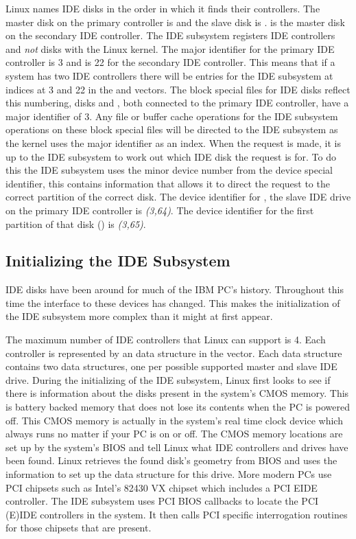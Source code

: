 Linux names IDE disks in the order in which it finds their controllers.
The master disk on the primary controller is  and the slave disk is .
 is the master disk on the secondary IDE controller.
The IDE subsystem registers IDE controllers and {\em not} disks with the Linux kernel.
The major identifier for the primary IDE controller is 3 and is 22 for the secondary IDE controller.
This means that if a system has two IDE controllers there will be entries for the IDE subsystem
at indices at 3 and 22 in the  and 
 vectors.
The block special files for IDE disks reflect this numbering, disks  and ,
both connected to the primary IDE controller, have a major identifier of 3.
Any file or buffer cache operations for the IDE subsystem operations on these block special files
will be directed to the IDE subsystem as the kernel uses the major identifier as an index.
When the request is made, it is up to the IDE subsystem to work out which IDE disk the request is for.
To do this  the IDE subsystem uses the minor device number from the device special identifier, this
contains information that allows it to direct the request to the correct partition of the correct
disk.
The device identifier for , the slave IDE drive on the primary IDE controller is {\em (3,64)}.
The device identifier for the first partition of that disk () is {\em (3,65)}.

\subsection{Initializing the IDE Subsystem}
IDE disks have been around for much of the IBM PC's history.
Throughout this time the interface to these devices has changed.
This makes the initialization of the IDE subsystem more complex than it might at first appear.

The maximum number of IDE controllers that Linux can support is 4.
Each controller is represented by an  data structure in the 
 vector.
Each  data structure contains two  data structures, one per possible
supported master and slave IDE drive.
During the initializing of the IDE subsystem, Linux first looks to see if there is information about the 
disks present in the system's CMOS memory.
This is battery backed memory that does not lose its contents when the PC is powered off.
This CMOS memory is actually in the system's real time clock device which always runs no matter if your
PC is on or off.
The CMOS memory locations are set up by the system's BIOS and tell Linux what IDE controllers and drives
have been found.
Linux retrieves the found disk's geometry from BIOS and uses the information to set up the 
data structure for this drive.
More modern PCs use PCI chipsets such as Intel's 82430 VX chipset which includes a PCI EIDE controller.
The IDE subsystem uses PCI BIOS callbacks to locate the PCI (E)IDE controllers in the system.
It then calls PCI specific interrogation routines for those chipsets that are present.

